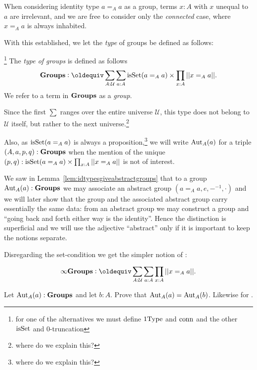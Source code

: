 \begin{remark}
  When considering identity type $a=_Aa$ as a group, terms $x:A$ with $x$ unequal to $a$ are irrelevant, and we are free to consider only the {\em connected} case, \ie where $x=_Aa$ is always inhabited.
\end{remark}



With this established, we let the {\em type} of groups be defined as follows:

\begin{definition}\footnote{for one of the alternatives we must define $\mathrm{1Type}$ and $\mathrm{conn}$ and the other  $\mathrm{isSet}$ and $0$-truncation}
  The {\em type of groups} is defined as follows
$$\typegroup\defequi\sum_{A:\mathcal U}\sum_{a:A}\isset(a=_Aa)\times\prod_{x:A}||x=_Aa||.$$
We refer to a term in $\mathbf{Groups}$ as a {\em group}.
\end{definition}
\begin{remark}
  Since the first $\sum$ ranges over the entire universe $\mathcal U$, this type does not belong to $\mathcal U$ itself, but rather to the next universe.\footnote{where do we explain this?}  

Also, as $\mathrm{isSet}(a=_Aa)$ is always a proposition,\footnote{where do we explain this?}   we will write $\mathrm{Aut}_A(a)$ for a triple $(A,a,p,q):\mathbf{Groups}$ when the mention of the unique $(p,q):\mathrm{isSet}(a=_Aa)\times\prod_{x:A}||x=_Aa||$ is not of interest.

We saw in Lemma~\ref{lem:idtypesgiveabstractgroups} that to a group $\mathrm{Aut}_A(a):\mathbf{Groups}$ we may associate an abstract group $(a=_Aa,e,{-}^{-1},\cdot)$ and we will later show that the group and the associated abstract group carry essentially the same data: from an abstract group we may construct a group and ``going back and forth either way is the identity''.
Hence the distinction is superficial and we will use the adjective ``abstract'' only if it is important to keep the notions separate.
\end{remark}
Disregarding the set-condition we get the simpler notion of \inftygps:
\begin{definition}
  $$\typeinftygp\defequi \sum_{A:\mathcal U}\sum_{a:A}\prod_{x:A}||x=_Aa||.$$
\end{definition}

\begin{xca}
   Let $\mathrm{Aut}_A(a):\mathbf{Groups}$ and let $b:A$.  Prove that $\mathrm{Aut}_A(a)=\mathrm{Aut}_A(b)$.  Likewise for \inftygps.
\end{xca}


